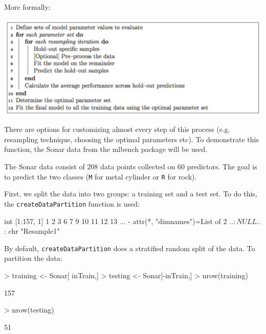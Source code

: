 \documentclass[12pt]{article}
\newcommand{\code}[1]{\mbox{\footnotesize\color{darkblue}\texttt{#1}}}
\newcommand{\pkg}[1]{{\fontseries{b}\selectfont #1}}
\renewcommand{\pkg}[1]{{\textsf{#1}}}
\renewenvironment{Schunk}{\vspace{\topsep}}{\vspace{\topsep}}
\begin{document}
More formally:

  \begin{center}  
    \includegraphics[clip, width = .9\textwidth]{train_algo}
  \end{center}

There are options for customizing almost every step of this process (e.g. resampling technique, choosing the optimal parameters etc). To demonstrate this function, the Sonar data from the \pkg{mlbench} package will be used.

The Sonar data consist of 208 data points collected on 60 predictors. The goal is to predict the two classes (\texttt{M} for metal cylinder or \texttt{R} for rock).

First, we split the data into two groups: a training set and a test set. To do this, the \code{createDataPartition} function is used:
\begin{Schunk}
\begin{Soutput}
 int [1:157, 1] 1 2 3 6 7 9 10 11 12 13 ...
 - attr(*, "dimnames")=List of 2
  ..$ : NULL
  ..$ : chr "Resample1"
\end{Soutput}
\end{Schunk}
By default, \code{createDataPartition} does a stratified random split of the data. To partition the data:

\begin{Schunk}
\begin{Sinput}
> training <- Sonar[ inTrain,]
> testing  <- Sonar[-inTrain,]
> nrow(training)
\end{Sinput}
\begin{Soutput}
[1] 157
\end{Soutput}
\begin{Sinput}
> nrow(testing)
\end{Sinput}
\begin{Soutput}
[1] 51
\end{Soutput}
\end{Schunk}
\end{document}
